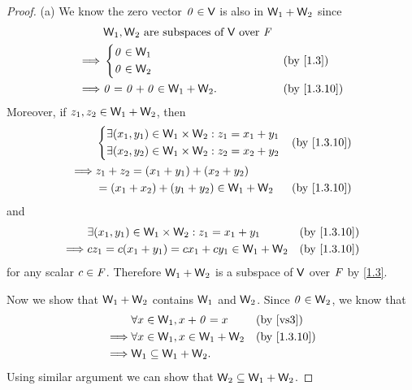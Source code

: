 \begin{proof}{(a)}
  We know the zero vector \(\mathit{0} \in \mathsf{V}\) is also in \(\mathsf{W}_{1} + \mathsf{W}_{2}\) since
  \begin{align*}
             & \W_{1}, \W_{2} \text{ are subspaces of } \V \text{ over } \F                                \\
    \implies & \begin{dcases}
      \zv \in \W_{1} \\
      \zv \in \W_{2}
    \end{dcases}                                   &  & \text{(by \cref{1.3})}    \\
    \implies & \zv = \zv + \zv \in \W_{1} + \W_{2}.                         &  & \text{(by \cref{1.3.10})}
  \end{align*}
  Moreover, if \(z_{1}, z_{2} \in \mathsf{W}_{1} + \mathsf{W}_{2}\), then
  \begin{align*}
             & \begin{dcases}
      \exists \p{x_{1}, y_{1}} \in \W_{1} \times \W_{2} : z_{1} = x_{1} + y_{1} \\
      \exists \p{x_{2}, y_{2}} \in \W_{1} \times \W_{2} : z_{2} = x_{2} + y_{2}
    \end{dcases}                                  &  & \text{(by \cref{1.3.10})} \\
    \implies & z_{1} + z_{2} = \p{x_{1} + y_{1}} + \p{x_{2} + y_{2}}                                      \\
             & = \p{x_{1} + x_{2}} + \p{y_{1} + y_{2}} \in \W_{1} + \W_{2} &  & \text{(by \cref{1.3.10})}
  \end{align*}
  and
  \begin{align*}
             & \exists \p{x_{1}, y_{1}} \in \W_{1} \times \W_{2} : z_{1} = x_{1} + y_{1} &  & \text{(by \cref{1.3.10})} \\
    \implies & cz_{1} = c\p{x_{1} + y_{1}} = cx_{1} + cy_{1} \in \W_{1} + \W_{2}         &  & \text{(by \cref{1.3.10})}
  \end{align*}
  for any scalar \(c \in \mathit{F}\).
  Therefore \(\mathsf{W}_{1} + \mathsf{W}_{2}\) is a subspace of \(\mathsf{V}\) over \(\mathit{F}\) by \cref{1.3}.

  Now we show that \(\mathsf{W}_{1} + \mathsf{W}_{2}\) contains \(\mathsf{W}_{1}\) and \(\mathsf{W}_{2}\).
  Since \(\mathit{0} \in \mathsf{W}_{2}\), we know that
  \begin{align*}
             & \forall x \in \W_{1}, x + \zv = x           &  & \text{(by \ref{vs3})}     \\
    \implies & \forall x \in \W_{1}, x \in \W_{1} + \W_{2} &  & \text{(by \cref{1.3.10})} \\
    \implies & \W_{1} \subseteq \W_{1} + \W_{2}.
  \end{align*}
  Using similar argument we can show that \(\mathsf{W}_{2} \subseteq \mathsf{W}_{1} + \mathsf{W}_{2}\).
\end{proof}

